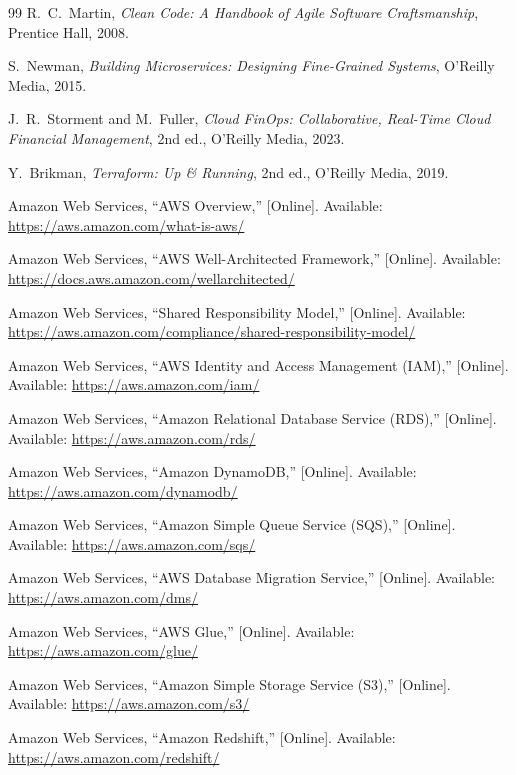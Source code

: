 \documentclass{article}
\begin{document}
\begin{thebibliography}{99}
R.~C.~Martin, \textit{Clean Code: A Handbook of Agile Software Craftsmanship}, Prentice Hall, 2008.

S.~Newman, \textit{Building Microservices: Designing Fine-Grained Systems}, O'Reilly Media, 2015.

J.~R.~Storment and M.~Fuller, \textit{Cloud FinOps: Collaborative, Real-Time Cloud Financial Management}, 2nd ed., O'Reilly Media, 2023.

Y.~Brikman, \textit{Terraform: Up \& Running}, 2nd ed., O'Reilly Media, 2019.

Amazon Web Services, ``AWS Overview,'' [Online]. Available: \url{https://aws.amazon.com/what-is-aws/}

Amazon Web Services, ``AWS Well-Architected Framework,'' [Online]. Available: \url{https://docs.aws.amazon.com/wellarchitected/}

Amazon Web Services, ``Shared Responsibility Model,'' [Online]. Available: \url{https://aws.amazon.com/compliance/shared-responsibility-model/}

Amazon Web Services, ``AWS Identity and Access Management (IAM),'' [Online]. Available: \url{https://aws.amazon.com/iam/}

Amazon Web Services, ``Amazon Relational Database Service (RDS),'' [Online]. Available: \url{https://aws.amazon.com/rds/}

Amazon Web Services, ``Amazon DynamoDB,'' [Online]. Available: \url{https://aws.amazon.com/dynamodb/}

Amazon Web Services, ``Amazon Simple Queue Service (SQS),'' [Online]. Available: \url{https://aws.amazon.com/sqs/}

Amazon Web Services, ``AWS Database Migration Service,'' [Online]. Available: \url{https://aws.amazon.com/dms/}

Amazon Web Services, ``AWS Glue,'' [Online]. Available: \url{https://aws.amazon.com/glue/}

Amazon Web Services, ``Amazon Simple Storage Service (S3),'' [Online]. Available: \url{https://aws.amazon.com/s3/}

Amazon Web Services, ``Amazon Redshift,'' [Online]. Available: \url{https://aws.amazon.com/redshift/}


\end{thebibliography}
\end{document}
